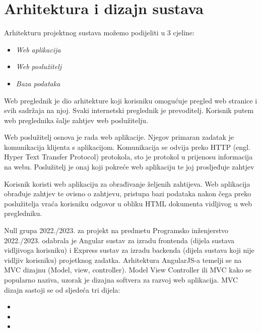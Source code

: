 \chapter{Arhitektura i dizajn sustava}
		\texttt{}{ Arhitekturu projektnog sustava možemo podijeliti u 3 cjeline:}
	\begin{itemize}
		\item 	\textit{Web aplikacija }
		\item 	\textit{Web poslužitelj}
		\item 	\textit{Baza podataka }		
	\end{itemize}


                \texttt{}{
             Web preglednik je dio arhitekture koji korisniku omogućuje pregled web stranice i svih sadržaja na njoj. Svaki internetski preglednik je prevoditelj. Korisnik putem web preglednika šalje zahtjev web poslužitelju. 
            }

            
                \texttt{}{
             Web poslužitelj osnova je rada web aplikacije. Njegov primaran zadatak je komunikacija klijenta s aplikacijom. Komunikacija se odvija preko HTTP (engl. Hyper Text Transfer Protocol) protokola, sto je protokol u prijenosu informacija na webu. Poslužitelj je onaj koji pokreće web aplikaciju te joj prosljeđuje zahtjev
            }


            
                \texttt{}{
            Korisnik koristi web aplikaciju za obrađivanje željenih zahtijeva. Web aplikacija obrađuje zahtjev te ovisno o zahtjevu, pristupa bazi podataka nakon čega preko poslužitelja vraća korisniku odgovor u obliku HTML dokumenta vidljivog u web pregledniku.}
               

                \texttt{}{
             Null grupa 2022./2023. za projekt na predmetu Programsko inženjerstvo 2022./2023. odabrala je Angular sustav za izradu frontenda (dijela sustava vidljivoga korisniku) i Express sustav za izradu backenda (dijela sustava koji nije vidljiv korisniku) projetknog zadatka. 
            Arhitektura AngularJS-a temelji se na MVC dizajnu (Model, view, controller).
            Model View Controller ili MVC kako se popularno naziva, uzorak je dizajna softvera za razvoj web aplikacija. MVC dizajn sastoji se od sljedeća tri dijela:
            }
            \begin{itemize}
		\item 	{}
		\item 	{}
		\item 	{}		
	\end{itemize}
        \eject

